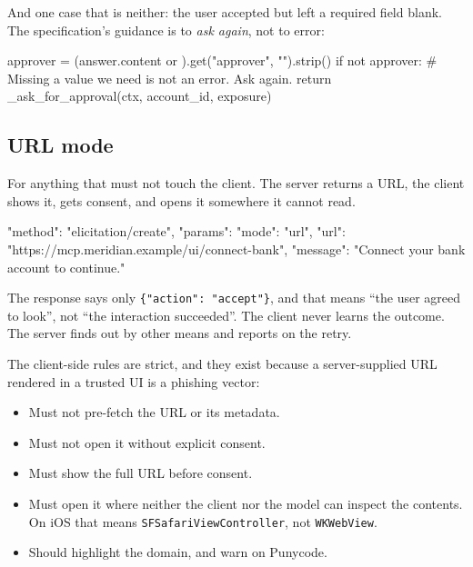 
And one case that is neither: the user accepted but left a required field blank.
The specification's guidance is to \emph{ask again}, not to error:

\begin{py}
approver = (answer.content or {}).get("approver", "").strip()
if not approver:
    # Missing a value we need is not an error. Ask again.
    return _ask_for_approval(ctx, account_id, exposure)
\end{py}

\subsection{URL mode}

For anything that must not touch the client. The server returns a URL, the
client shows it, gets consent, and opens it somewhere it cannot read.

\begin{wire}
{
  "method": "elicitation/create",
  "params": {
    "mode": "url",
    "url": "https://mcp.meridian.example/ui/connect-bank",
    "message": "Connect your bank account to continue."
  }
}
\end{wire}

The response says only \texttt{\{"action": "accept"\}}, and that means ``the user
agreed to look'', not ``the interaction succeeded''. The client never learns the
outcome. The server finds out by other means and reports on the retry.

The client-side rules are strict, and they exist because a server-supplied URL
rendered in a trusted UI is a phishing vector:

\begin{itemize}[leftmargin=1.6em, itemsep=2pt]
\item Must not pre-fetch the URL or its metadata.
\item Must not open it without explicit consent.
\item Must show the full URL before consent.
\item Must open it where neither the client nor the model can inspect the
contents. On iOS that means \texttt{SFSafariViewController}, not
\texttt{WKWebView}.
\item Should highlight the domain, and warn on Punycode.
\end{itemize}

